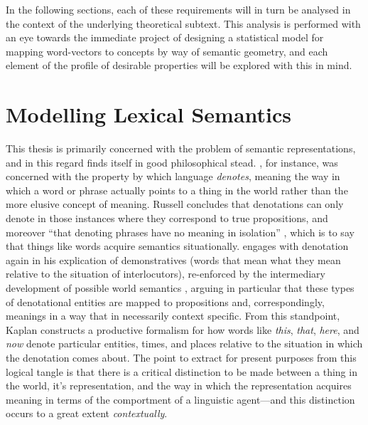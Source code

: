 In the following sections, each of these requirements will in turn be analysed in the context of the underlying theoretical subtext.  This analysis is performed with an eye towards the immediate project of designing a statistical model for mapping word-vectors to concepts by way of semantic geometry, and each element of the profile of desirable properties will be explored with this in mind.

\section{Modelling Lexical Semantics} \label{sec:lexsem}
This thesis is primarily concerned with the problem of semantic representations, and in this regard finds itself in good philosophical stead.  \citeauthor{Russell1905}, for instance, was concerned with the property by which language \emph{denotes}, meaning the way in which a word or phrase actually points to a thing in the world rather than the more elusive concept of meaning.  Russell concludes that denotations can only denote in those instances where they correspond to true propositions, and moreover ``that denoting phrases have no meaning in isolation'' \citep[][p. 192]{Russell1905}, which is to say that things like words acquire semantics situationally.  \cite{Kaplan1979} engages with denotation again in his explication of demonstratives (words that mean what they mean relative to the situation of interlocutors), re-enforced by the intermediary development of possible world semantics \citep{Carnap1947}, arguing in particular that these types of denotational entities are mapped to propositions and, correspondingly, meanings in a way that in necessarily context specific.  From this standpoint, Kaplan constructs a productive formalism for how words like \emph{this}, \emph{that}, \emph{here}, and \emph{now} denote particular entities, times, and places relative to the situation in which the denotation comes about.  The point to extract for present purposes from this logical tangle is that there is a critical distinction to be made between a thing in the world, it's representation, and the way in which the representation acquires meaning in terms of the comportment of a linguistic agent---and this distinction occurs to a great extent \emph{contextually}.

